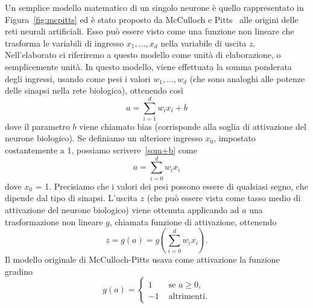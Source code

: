 \documentclass[11pt,a4paper,twoside,
openright]{book}
\begin{document}
Un semplice modello matematico di un singolo neurone è quello rappresentato in Figura~\ref{fig:mcpitts} ed è stato proposto da McCulloch e Pitts~\cite{McCulloch:1943aa} alle origini delle reti neurali artificiali. Esso può essere visto come una funzione non lineare che trasforma le variabili di ingresso $x_{1}, \dots, x_{d}$ nella variabile di uscita $z$. Nell’elaborato ci riferiremo a questo modello come unità di elaborazione, o semplicemente unità.
In questo modello, viene effettuata la somma ponderata degli ingressi, usando come pesi i valori $w_{1}, \dots, w_{d}$ (che sono analoghi alle potenze delle sinapsi nella rete biologica), ottenendo così
\begin{equation}
a = \sum\limits_{i=1}^d w_{i}x_{i}+b
\label{som+b}
\end{equation}
dove il parametro $b$ viene chiamato bias (corrisponde alla soglia di attivazione del neurone biologico). Se definiamo un ulteriore ingresso $x_{0}$, impostato costantemente a 1, possiamo scrivere~\eqref{som+b} come
\begin{equation}
a = \sum\limits_{i=0}^d w_{i}x_{i}
\label{som}
\end{equation}
dove $x_{0}$ = 1. Precisiamo che i valori dei pesi possono essere di qualsiasi segno, che dipende dal tipo di sinapsi. L’uscita $z$ (che può essere vista come tasso medio di attivazione del neurone biologico) viene ottenuta applicando ad $a$ una trasformazione non lineare $g$, chiamata funzione di attivazione, ottenendo 
\begin{equation}
z=g(a)=g\left( \sum\limits_{i=0}^d w_{i}x_{i} \right).
\label{act+som}
\end{equation}
Il modello originale di McCulloch-Pitts usava come attivazione la funzione gradino
\begin{equation}
g(a)=
\begin{cases}
1 &\text{ se } a\geq0, \\
-1 &\text{ altrimenti}.
\end{cases}
\label{act+som}
\end{equation}
\end{document}

